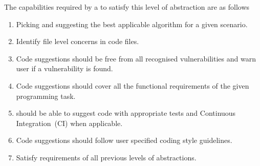 The capabilities required by a \cct{} to satisfy this level of abstraction are as follows
\begin{enumerate}
    \item Picking and suggesting the best applicable algorithm for a given scenario.
    \item Identify file level concerns in code files.
    \item Code suggestions should be free from all recognised vulnerabilities and warn user if a vulnerability is found.
    \item Code suggestions should cover all the functional requirements of the given programming task.
    \item \cct{} should be able to suggest code with appropriate tests and Continuous Integration~(CI) when applicable.
    \item Code suggestions should follow user specified coding style guidelines.
    \item Satisfy requirements of all previous levels of abstractions.
\end{enumerate}

